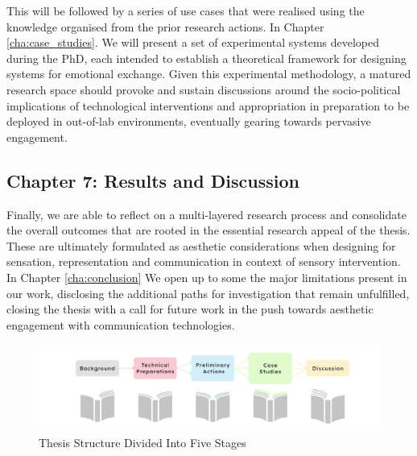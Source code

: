 This will be followed by a series of use cases that were realised using the knowledge organised from the prior research actions. In Chapter \ref{cha:case_studies}. We will present a set of experimental systems developed during the PhD, each intended to establish a theoretical framework for designing systems for emotional exchange. Given this experimental methodology, a matured research space should provoke and sustain discussions around the socio-political implications of technological interventions and appropriation in preparation to be deployed in out-of-lab environments, eventually gearing towards pervasive engagement.

\subsection{Chapter 7: Results and Discussion}

Finally, we are able to reflect on a multi-layered research process and consolidate the overall outcomes that are rooted in the essential research appeal of the thesis. These are ultimately formulated as aesthetic considerations when designing for sensation, representation and communication in context of sensory intervention. In Chapter \ref{cha:conclusion} We open up to some the major limitations present in our work, disclosing the additional paths for investigation that remain unfulfilled, closing the thesis with a call for future work in the push towards aesthetic engagement with communication technologies.

\begin{figure}[htbp]
	\centering
	\includegraphics[width=1.0\textwidth]{Chapters/Figures/background/Sec1_Thesis_Structure}
	\caption{Thesis Structure Divided Into Five Stages}
	\label{fig:Concept_Venn}
\end{figure}

